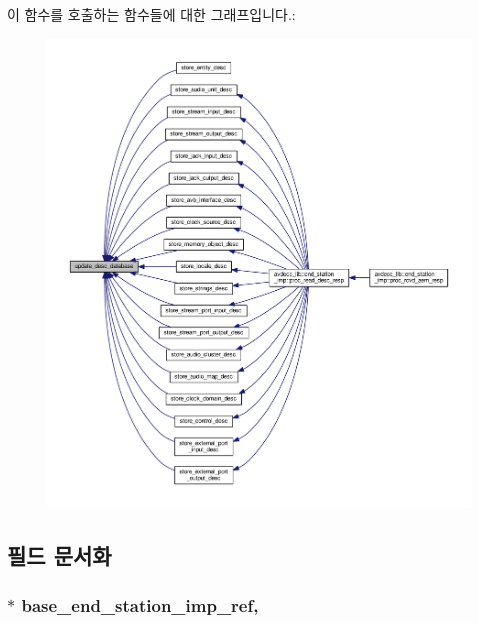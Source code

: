 이 함수를 호출하는 함수들에 대한 그래프입니다.\+:
\nopagebreak
\begin{figure}[H]
\begin{center}
\leavevmode
\includegraphics[width=350pt]{classavdecc__lib_1_1configuration__descriptor__imp_a98445251711b644b6da09d2354003778_icgraph}
\end{center}
\end{figure}




\subsection{필드 문서화}
\subsubsection[{\texorpdfstring{base\+\_\+end\+\_\+station\+\_\+imp\+\_\+ref}{base_end_station_imp_ref}}]{$\ast$ base\+\_\+end\+\_\+station\+\_\+imp\+\_\+ref\hspace{0.3cm}{\ttfamily [protected]}, {\ttfamily [inherited]}}\hypertarget{classavdecc__lib_1_1descriptor__base__imp_a550c969411f5f3b69f55cc139763d224}{}\label{classavdecc__lib_1_1descriptor__base__imp_a550c969411f5f3b69f55cc139763d224}


